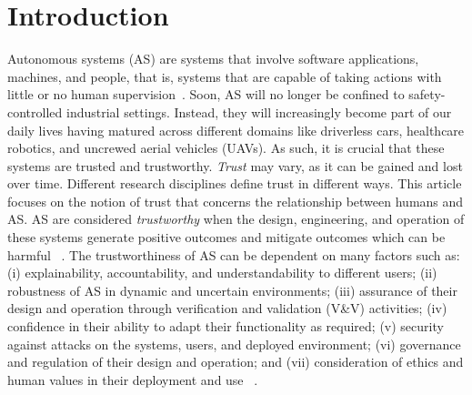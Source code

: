 \documentclass[sigconf,nonacm]{acmart}%
\begin{document}
	\section{Introduction}\label{introduction}
	Autonomous systems (AS) are systems that involve software applications, machines, and people, that is, systems that are capable of taking actions with little or no human supervision~\cite{Murukannaiah2020}. %
	Soon, AS will no longer be confined to safety-controlled industrial settings. Instead, they will increasingly become part of our daily lives having matured across different domains like driverless cars, healthcare robotics, and uncrewed aerial vehicles (UAVs). As such, it is crucial that these systems are trusted and trustworthy. \emph{Trust} may vary, as it can be gained and lost over time. Different research disciplines define trust in different ways. This article focuses on the notion of trust that concerns the relationship between humans and AS. AS are considered \emph{trustworthy} when the design, engineering, and operation of these systems generate positive outcomes and mitigate outcomes which can be harmful ~\cite{Naiseh2022}.
	The trustworthiness of AS can be dependent on many factors such as: (i) explainability, accountability, and understandability to different users; (ii) robustness of AS in dynamic and uncertain environments; (iii) assurance of their design and operation through verification and validation (V\&V) activities; (iv) confidence in their ability to adapt their functionality as required; (v) security against attacks on the systems, users, and deployed environment; (vi) governance and regulation of their design and operation; and (vii) consideration of ethics and human values in their deployment and use ~\cite{Naiseh2022}. 
	
\end{document}
